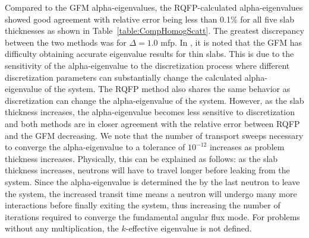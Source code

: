Compared to the GFM alpha-eigenvalues, the RQFP-calculated alpha-eigenvalues showed good agreement with relative error being less than  0.1\% for all five slab thicknesses as shown in Table~\ref{table:CompHomogScatt}. The greatest discrepancy between the two methods was for $\Delta = 1.0$ mfp. In \cite{kornreich_timeeigenvalue_2005}, it is noted that the GFM has difficulty obtaining accurate eigenvalue results for thin slabs. This is due to the sensitivity of the alpha-eigenvalue to the discretization process where different discretization parameters can substantially change the calculated alpha-eigenvalue of the system. The RQFP method also shares the same behavior as discretization can change the alpha-eigenvalue of the system. However, as the slab thickness increases, the alpha-eigenvalue becomes less sensitive to discretization and both methods are in closer agreement with the relative error between RQFP and the GFM decreasing. We note that the number of transport sweeps necessary to converge the alpha-eigenvalue to a tolerance of $10^{-12}$ increases as problem thickness increases. Physically, this can be explained as follows: as the slab thickness increases, neutrons will have to travel longer before leaking from the system. Since the alpha-eigenvalue is determined the by the last neutron to leave the system, the increased transit time means a neutron will undergo many more interactions before finally exiting the system, thus increasing the number of iterations required to converge the fundamental angular flux mode. For problems without any multiplication, the $k$-effective eigenvalue is not defined.


